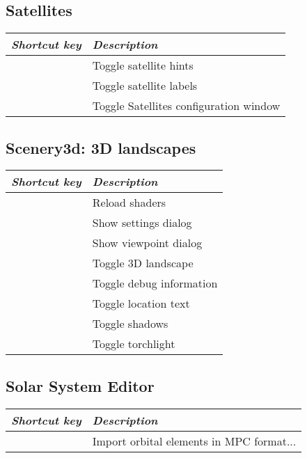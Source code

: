 \subsection{Satellites}
\label{ch:Hotkeys:Plugins:Satellites}
\begin{longtabu}to \textwidth {rl} 
\toprule
\emph{Shortcut key}	& \emph{Description}\\\midrule
{}		& Toggle satellite hints \\
	& Toggle satellite labels \\
			& Toggle Satellites configuration window \\
\bottomrule
\end{longtabu}

\subsection{Scenery3d: 3D landscapes}
\label{ch:Hotkeys:Plugins:Scenery3d}
\begin{longtabu}to \textwidth {rl} 
\toprule
\emph{Shortcut key}	& \emph{Description}\\\midrule
{}	& Reload shaders \\
	& Show settings dialog \\
	& Show viewpoint dialog \\
		& Toggle 3D landscape \\
	& Toggle debug information \\
	& Toggle location text \\
	& Toggle shadows \\
	& Toggle torchlight \\
\bottomrule
\end{longtabu}

\subsection{Solar System Editor}
\label{ch:Hotkeys:Plugins:SolarSystemEditor}
\begin{longtabu}to \textwidth {rl} 
\toprule
\emph{Shortcut key}	& \emph{Description}\\\midrule
{}	& Import orbital elements in MPC format... \\
\bottomrule
\end{longtabu}

